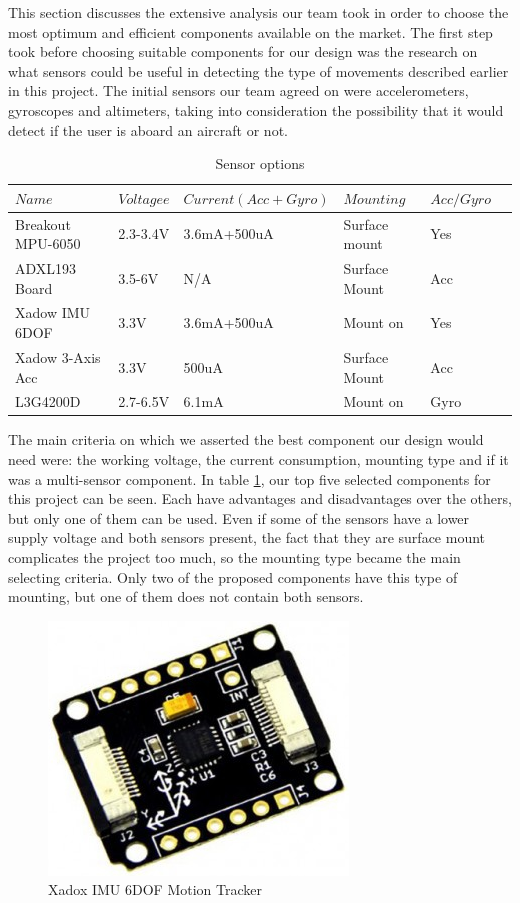This section discusses the extensive analysis our team took in order to choose the most optimum and efficient components available on the market. The first step took before choosing suitable components for our design was the research on what sensors could be useful in detecting the type of movements described earlier in this project. The initial sensors our team agreed on were accelerometers, gyroscopes and altimeters, taking into consideration the possibility that it would detect if the user is aboard an aircraft or not.
\begin{table}[h]
	\centering
	\begin{tabular}{llllll}
		\hline
		$Name$ & $Voltagee$ & $Current(Acc+Gyro)$ & $Mounting$ & $Acc/Gyro$ \\
		\hline
		Breakout MPU-6050 & 2.3-3.4V & 3.6mA+500uA & Surface mount & Yes\\
		\hline
		 ADXL193 Board & 3.5-6V & N/A & Surface Mount & Acc \\
		\hline
		Xadow IMU 6DOF  & 3.3V &  3.6mA+500uA & Mount on & Yes \\
		\hline
		Xadow 3-Axis Acc &  3.3V & 500uA & Surface Mount & Acc \\
		\hline
		 L3G4200D &  2.7-6.5V & 6.1mA & Mount on  & Gyro \\
		\hline
	\end{tabular}
	\caption{Sensor options}
	\label{table: componentsx}
\end{table}

The main criteria on which we asserted the best component our design would need were: the working voltage, the current consumption, mounting type and if it was a multi-sensor component. In table \ref{table: componentsx}, our top five selected components for this project can be seen. Each have advantages and disadvantages over the others, but only one of them can be used. Even if some of the sensors have a lower supply voltage and both sensors present, the fact that they are surface mount complicates the project too much, so the mounting type became the main selecting criteria. Only two of the proposed components have this type of mounting, but one of them does not contain both sensors.

\begin{figure}
\centering
\includegraphics[scale=0.4]{figures/Xadow_IMU_6DOF.PNG}
\caption{Xadox IMU 6DOF Motion Tracker \label{fig:xadox}}
\end{figure}


